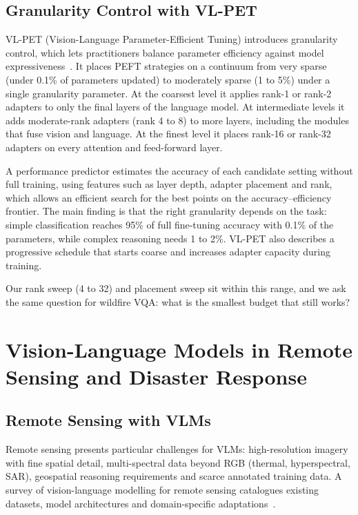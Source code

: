 \documentclass[12pt]{report}
\begin{document}
\subsection{Granularity Control with VL-PET}
VL-PET (Vision-Language Parameter-Efficient Tuning) introduces granularity control, which lets practitioners balance parameter efficiency against model expressiveness~\cite{vlpet2024}. It places PEFT strategies on a continuum from very sparse (under 0.1\% of parameters updated) to moderately sparse (1 to 5\%) under a single granularity parameter. At the coarsest level it applies rank-1 or rank-2 adapters to only the final layers of the language model. At intermediate levels it adds moderate-rank adapters (rank 4 to 8) to more layers, including the modules that fuse vision and language. At the finest level it places rank-16 or rank-32 adapters on every attention and feed-forward layer.

A performance predictor estimates the accuracy of each candidate setting without full training, using features such as layer depth, adapter placement and rank, which allows an efficient search for the best points on the accuracy--efficiency frontier. The main finding is that the right granularity depends on the task: simple classification reaches 95\% of full fine-tuning accuracy with 0.1\% of the parameters, while complex reasoning needs 1 to 2\%. VL-PET also describes a progressive schedule that starts coarse and increases adapter capacity during training.

Our rank sweep (4 to 32) and placement sweep sit within this range, and we ask the same question for wildfire VQA: what is the smallest budget that still works?

\section{Vision-Language Models in Remote Sensing and Disaster Response}

\subsection{Remote Sensing with VLMs}
Remote sensing presents particular challenges for VLMs: high-resolution imagery with fine spatial detail, multi-spectral data beyond RGB (thermal, hyperspectral, SAR), geospatial reasoning requirements and scarce annotated training data. A survey of vision-language modelling for remote sensing catalogues existing datasets, model architectures and domain-specific adaptations~\cite{remotesensing2024}.
\end{document}
